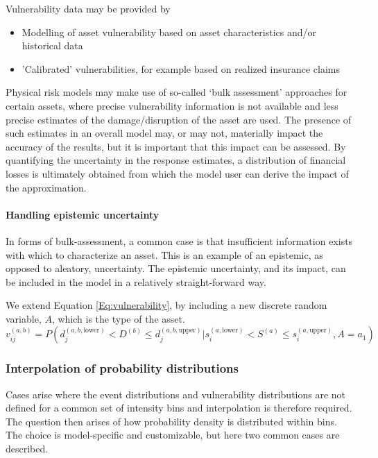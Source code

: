 \documentclass{article}
\begin{document}
Vulnerability data may be provided by
\begin{itemize}
    \item Modelling of asset vulnerability based on asset characteristics and/or historical data
    \item 'Calibrated' vulnerabilities, for example based on realized insurance claims
\end{itemize}
Physical risk models may make use of so-called `bulk assessment' approaches for certain assets, where precise vulnerability information is not available and less precise estimates of the damage/disruption of the asset are used. The presence of such estimates in an overall model may, or may not, materially impact the accuracy of the results, but it is important that this impact can be assessed. By quantifying the uncertainty in the response estimates, a distribution of financial losses is ultimately obtained from which the model user can derive the impact of the approximation.

\paragraph{Handling epistemic uncertainty}
In forms of bulk-assessment, a common case is that insufficient information exists with which to characterize an asset. This is an example of an epistemic, as opposed to aleatory, uncertainty. The epistemic uncertainty, and its impact, can be included in the model in a relatively straight-forward way.

We extend Equation \ref{Eq:vulnerability}, by including a new discrete random variable, $A$, which is the type of the asset.
\begin{equation}
    \label{Eq:vulnerability}
    v^{(a, b)}_{ij} = P \left( d^{(a,b,\text{lower})}_j < D^{(b)} \le d^{(a,b,\text{upper})}_j | s^{(a, \text{lower})}_i < S^{(a)} \le s^{(a, \text{upper})}_i, A = a_1 \right)
\end{equation}


\subsubsection{Interpolation of probability distributions}
Cases arise where the event distributions and vulnerability distributions are not defined for a common set of intensity bins and interpolation is therefore required. The question then arises of how probability density is distributed within bins. The choice is model-specific and customizable, but here two common cases are described.
\end{document}
